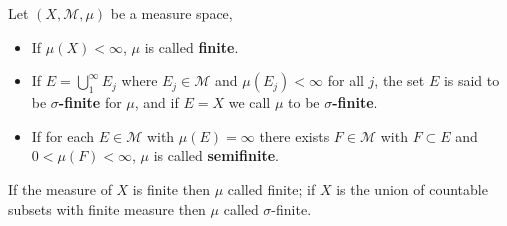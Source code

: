 \begin{definition}
 \normalfont Let $(X, \mathcal{M}, \mu)$ be a measure space,
 \begin{itemize}
    \item If $\mu(X) < \infty$, $\mu$ is called \textbf{finite}.
    \item If $E = \bigcup_{1}^{\infty} E_j$ where $E_j \in \mathcal{M}$ and $\mu(E_j) < \infty$ for all $j$, the set $E$ is said to be \textbf{$\sigma$-finite} for $\mu$, and if $E = X$ we call $\mu$ to be \textbf{$\sigma$-finite}.
    \item If for each $E \in \mathcal{M}$ with $\mu(E) = \infty$ there exists $F \in \mathcal{M}$ with $F \subset E$ and $0 < \mu(F) < \infty$, $\mu$ is called \textbf{semifinite}.
 \end{itemize}
\end{definition}
\begin{defintuition}
    If the measure of $X$ is finite then $\mu$ called finite; if $X$ is the union of countable subsets with finite measure then $\mu$ called $\sigma$-finite.
\end{defintuition}
